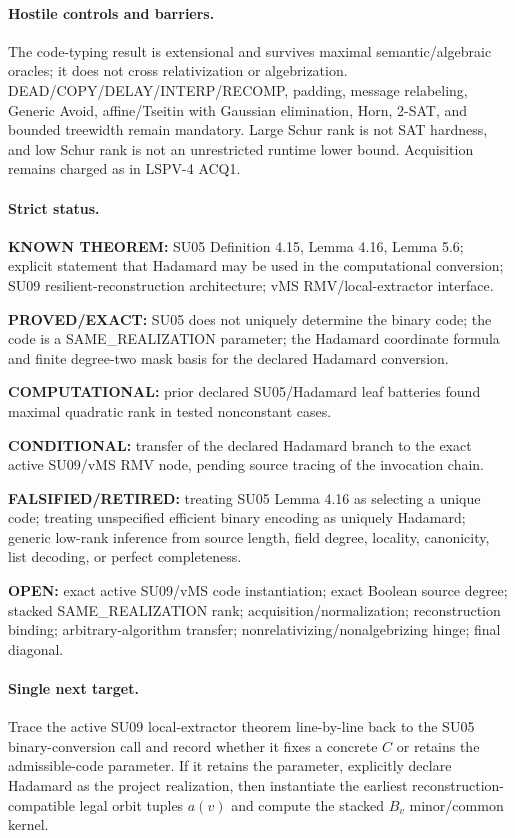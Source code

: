 \documentclass[11pt]{article}
\begin{document}
\paragraph{Hostile controls and barriers.}
The code-typing result is extensional and survives maximal semantic/algebraic oracles; it does not cross relativization or algebrization. DEAD/COPY/DELAY/INTERP/RECOMP, padding, message relabeling, Generic Avoid, affine/Tseitin with Gaussian elimination, Horn, 2-SAT, and bounded treewidth remain mandatory. Large Schur rank is not SAT hardness, and low Schur rank is not an unrestricted runtime lower bound. Acquisition remains charged as in LSPV-4 ACQ1.

\paragraph{Strict status.}
\textbf{KNOWN THEOREM:} SU05 Definition 4.15, Lemma 4.16, Lemma 5.6; explicit statement that Hadamard may be used in the computational conversion; SU09 resilient-reconstruction architecture; vMS RMV/local-extractor interface.

\textbf{PROVED/EXACT:} SU05 does not uniquely determine the binary code; the code is a SAME\_REALIZATION parameter; the Hadamard coordinate formula and finite degree-two mask basis for the declared Hadamard conversion.

\textbf{COMPUTATIONAL:} prior declared SU05/Hadamard leaf batteries found maximal quadratic rank in tested nonconstant cases.

\textbf{CONDITIONAL:} transfer of the declared Hadamard branch to the exact active SU09/vMS RMV node, pending source tracing of the invocation chain.

\textbf{FALSIFIED/RETIRED:} treating SU05 Lemma 4.16 as selecting a unique code; treating unspecified efficient binary encoding as uniquely Hadamard; generic low-rank inference from source length, field degree, locality, canonicity, list decoding, or perfect completeness.

\textbf{OPEN:} exact active SU09/vMS code instantiation; exact Boolean source degree; stacked SAME\_REALIZATION rank; acquisition/normalization; reconstruction binding; arbitrary-algorithm transfer; nonrelativizing/nonalgebrizing hinge; final diagonal.

\paragraph{Single next target.}
Trace the active SU09 local-extractor theorem line-by-line back to the SU05 binary-conversion call and record whether it fixes a concrete $C$ or retains the admissible-code parameter. If it retains the parameter, explicitly declare Hadamard as the project realization, then instantiate the earliest reconstruction-compatible legal orbit tuples $a(v)$ and compute the stacked $B_v$ minor/common kernel.
\end{document}
